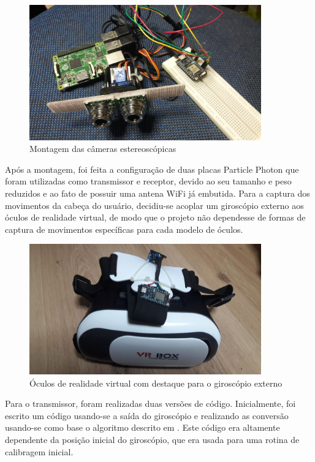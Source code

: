 \begin{figure}[h!]
	\caption{\label{fig_camera_mount}  Montagem das câmeras estereoscópicas}
	\begin{center}
		\includegraphics[width=100mm]{14407821_1315291101835033_240409903_o.jpg}	
	\end{center}
\end{figure}

Após a montagem, foi feita a configuração de duas placas Particle Photon que foram utilizadas como transmissor e receptor, devido ao seu tamanho e peso reduzidos e ao fato de possuir uma antena WiFi já embutida.
Para a captura dos movimentos da cabeça do usuário, decidiu-se acoplar um giroscópio externo aos óculos de realidade virtual, de modo que o projeto não dependesse de formas de captura de movimentos específicas para cada modelo de óculos.\par
\begin{figure}[h!]
	\caption{\label{fig_vrglasses}  Óculos de realidade virtual com destaque para o giroscópio externo}
	\begin{center}
		\includegraphics[width=100mm]{14424070_1315290465168430_612088294_o.jpg}	
	\end{center}
\end{figure}
Para o transmissor, foram realizadas duas versões de código.
Inicialmente, foi  escrito um código usando-se a saída do giroscópio e realizando as conversão usando-se como base o algoritmo descrito em \cite{debra}. Este código era altamente dependente da posição inicial do giroscópio, que era usada para uma rotina de calibragem inicial.\par

